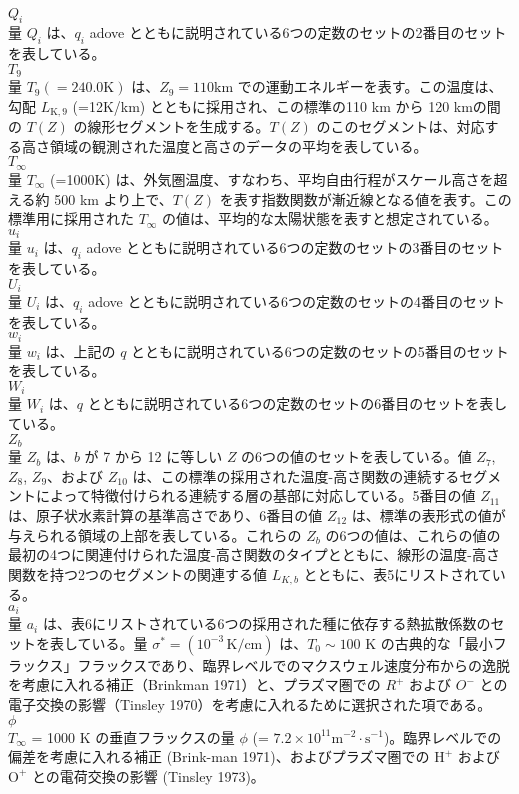 \documentclass{article}
\begin{document}
\\$Q_i$\\
量 $Q_i$ は、$q_i$ adove とともに説明されている6つの定数のセットの2番目のセットを表している。
\\$T_9$\\
量 $T_9 (=240.0\text{K})$ は、$Z_9 = 110\mathrm{km}$ での運動エネルギーを表す。この温度は、勾配 $L_{\text{K},9}$ (=12K/km) とともに採用され、この標準の110 km から 120 kmの間の $T(Z)$ の線形セグメントを生成する。$T(Z)$ のこのセグメントは、対応する高さ領域の観測された温度と高さのデータの平均を表している。
\\$T_\infty$\\
量 $T_\infty$ (=1000K) は、外気圏温度、すなわち、平均自由行程がスケール高さを超える約 500 km より上で、$T(Z)$ を表す指数関数が漸近線となる値を表す。この標準用に採用された $T_\infty$ の値は、平均的な太陽状態を表すと想定されている。
\\$u_i$\\
量 $u_i$ は、$q_i$ adove とともに説明されている6つの定数のセットの3番目のセットを表している。
\\$U_i$\\
量 $U_i$ は、$q_i$ adove とともに説明されている6つの定数のセットの4番目のセットを表している。
\\$w_i$\\
量 $w_i$ は、上記の $q$ とともに説明されている6つの定数のセットの5番目のセットを表している。
\\$W_i$\\
量 $W_i$ は、$q$ とともに説明されている6つの定数のセットの6番目のセットを表している。
\\$Z_b$\\
量 $Z_b$ は、$b$ が 7 から 12 に等しい $Z$ の6つの値のセットを表している。値 $Z_7$, $Z_8$, $Z_9$、および $Z_{10}$ は、この標準の採用された温度-高さ関数の連続するセグメントによって特徴付けられる連続する層の基部に対応している。5番目の値 $Z_{11}$ は、原子状水素計算の基準高さであり、6番目の値 $Z_{12}$ は、標準の表形式の値が与えられる領域の上部を表している。これらの $Z_b$ の6つの値は、これらの値の最初の4つに関連付けられた温度-高さ関数のタイプとともに、線形の温度-高さ関数を持つ2つのセグメントの関連する値 $L_{K,b}$ とともに、表5にリストされている。
\\$a_i$\\
量 $a_i$ は、表6にリストされている6つの採用された種に依存する熱拡散係数のセットを表している。量 $\sigma^* = (10^{-3}\, \mathrm{K/cm})$ は、$T_{0} \sim 100$ K の古典的な「最小フラックス」フラックスであり、臨界レベルでのマクスウェル速度分布からの逸脱を考慮に入れる補正（Brinkman 1971）と、プラズマ圏での $R^+$ および $O^-$ との電子交換の影響（Tinsley 1970）を考慮に入れるために選択された項である。
\\$\phi$\\
$T _\infty$ = 1000 K の垂直フラックスの量 $\phi$ (= $7.2\times 10^{11}\text{m}^{-2} \cdot \text{s}^{-1}$)。臨界レベルでの偏差を考慮に入れる補正 (Brink-man 1971)、およびプラズマ圏での $\text{H}^+$ および $\text{O}^+$ との電荷交換の影響 (Tinsley 1973)。
\end{document}
